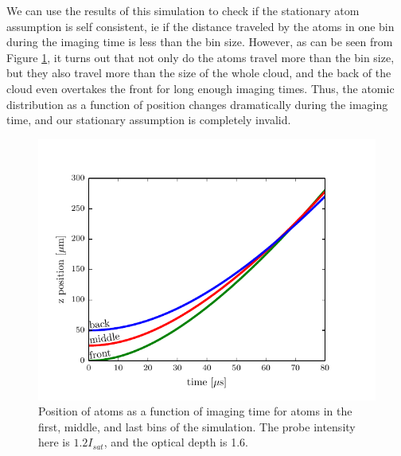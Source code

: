 \documentclass[12pt]{iopart}
\begin{document}
\par We can use the results of this simulation to check if the stationary atom assumption is self consistent, ie if the distance traveled by the atoms in one bin during the imaging time is less than the bin size. However, as can be seen from Figure \ref{fig:atomTravel}, it turns out that not only do the atoms travel more than the bin size, but they also travel more than the size of the whole cloud, and the back of the cloud even overtakes the front for long enough imaging times. Thus, the atomic distribution as a function of position changes dramatically during the imaging time, and our stationary assumption is completely invalid. 
\begin{figure}
	\includegraphics{figure4.pdf}
\caption{Position of atoms as a function of imaging time for atoms in the first, middle, and last bins of the simulation. The probe intensity here is $1.2 I_{sat}$, and the optical depth is 1.6.}  
\label{fig:atomTravel}
\end{figure}
\end{document}
